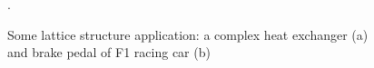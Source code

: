 \begin{figure}
    \centering
    \qquad
    \caption[Lattice structure applications.]{Some lattice structure application: a complex heat exchanger (a) and brake pedal of F1 racing car (b) \cite{milewski_additive_2017, du_plessis_beautiful_2019}}.
\end{figure}
